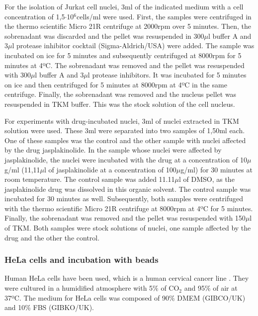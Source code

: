 \documentclass[12pt, a4paper]{article} %
\begin{document}
	\setlength{\parskip}{4mm}
	
	For the isolation of Jurkat cell nuclei, 3ml of the indicated medium with a cell concentration of 1,5$\cdot$10$^6$cells/ml were used. First, the samples were centrifuged in the thermo scientific Micro 21R centrifuge at 2000rpm over 5 minutes. Then, the sobrenadant was discarded and the pellet was resuspended in 300$\mu$l buffer A and 3$\mu$l protease inhibitor cocktail (Sigma-Aldrich/USA) were added. The sample was incubated on ice for 5 minutes and subsequently centrifuged at 8000rpm for 5 minutes at 4ºC. The sobrenadant was removed and the pellet was resuspended with 300$\mu$l buffer A and 3$\mu$l protease inhibitors. It was incubated for 5 minutes on ice and then centrifuged for 5 minutes at 8000rpm at 4ºC in the same centrifuge. Finally, the sobrenadant was removed and the nucleus pellet was resuspended in TKM buffer. This was the stock solution of the cell nucleus.
	
	For experiments with drug-incubated nuclei, 3ml of nuclei extracted in TKM solution were used. These 3ml were separated into two samples of 1,50ml each. One of these samples was the control and the other sample with nuclei affected by the drug jasplakinolide. In the sample whose nuclei were affected by jasplakinolide, the nuclei were incubated with the drug at a concentration of 10$\mu$g/ml (11,11$\mu$l of jasplakinolide at a concentration of 100$\mu$g/ml) for 30 minutes at room temperature. The control sample was added 11.11$\mu$l of DMSO, as the jasplakinolide drug was dissolved in this organic solvent. The control sample was incubated for 30 minutes as well. Subsequently, both samples were centrifuged with the thermo scientific Micro 21R centrifuge at 8000rpm at 4ºC for 5 minutes. Finally, the sobrenadant was removed and the pellet was resuspended with 150$\mu$l of TKM. Both samples were stock solutions of nuclei, one sample affected by the drug and the other the control.
	
	\setlength{\parskip}{0mm}
	
	\subsubsection{HeLa cells and incubation with beads}
	
	Human HeLa cells have been used, which is a human cervical cancer line \cite{gey1952tissue}. They were cultured in a humidified atmosphere with 5\% of CO$_{2}$ and 95\% of air at 37ºC. The medium for HeLa cells was composed of 90\% DMEM (GIBCO/UK) and 10\% FBS (GIBKO/UK).
	
\end{document}
